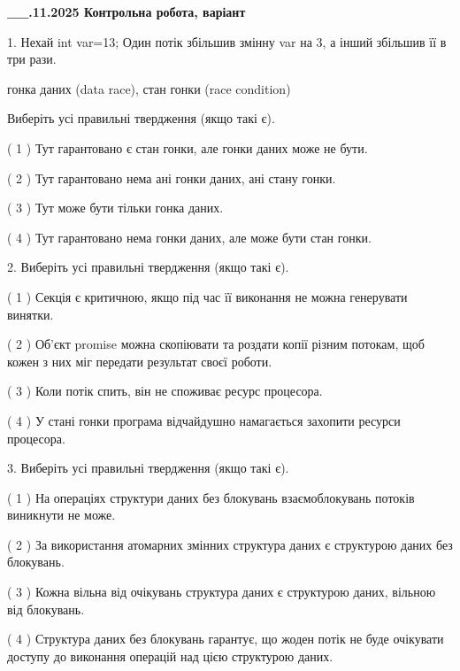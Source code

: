\documentclass[12pt, ukrainian]{article}
\begin{document}
\newpage
\begin {large}

\textbf{\_\_.11.2025 Контрольна робота, варіант  }\par


{
1. Нехай int var=13; Один потік збільшив змінну var на 3, а інший збільшив її в три рази.

гонка даних (data race), стан гонки (race condition)

Виберіть усі правильні твердження (якщо такі є).\par
\vspace{2mm}
( 1 ) Тут гарантовано є стан гонки, але гонки даних може не бути.%

( 2 ) Тут гарантовано нема ані гонки даних, ані стану гонки.%

( 3 ) Тут може бути тільки гонка даних.%

( 4 ) Тут гарантовано нема гонки даних, але може бути стан гонки.%


2. Виберіть усі правильні твердження (якщо такі є).\par
\vspace{2mm}

( 1 ) Секція є критичною, якщо під час її виконання не можна генерувати винятки.%

( 2 ) Об’єкт promise можна скопіювати та роздати копії різним потокам, щоб кожен з них міг передати результат своєї роботи.%

( 3 ) Коли потік спить, він не споживає ресурс процесора.%

( 4 ) У стані гонки програма відчайдушно намагається захопити ресурси процесора.%


3. Виберіть усі правильні твердження (якщо такі є).\par
\vspace{2mm}

( 1 ) На операціях структури даних без блокувань взаємоблокувань потоків виникнути не може.%

( 2 ) За використання атомарних змінних структура даних є структурою даних без блокувань.%

( 3 ) Кожна вільна від очікувань структура даних є структурою даних, вільною від блокувань.%

( 4 ) Структура даних без блокувань гарантує, що жоден потік не буде очікувати доступу до виконання операцій над цією структурою даних.%


}
\end{large}
\end{document}
